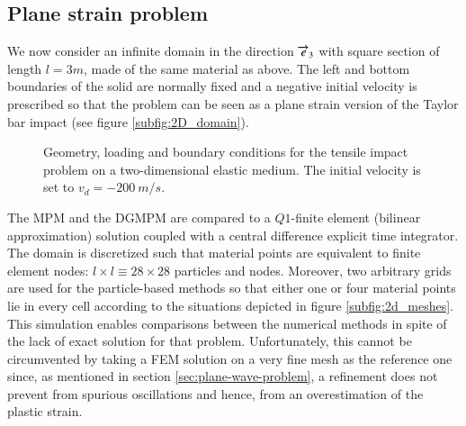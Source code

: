 
\subsection{Plane strain problem}
\label{sec:plane-strain-problem}
We now consider an infinite domain in the direction ${\overrightarrow{e}}_3$ with square section of length $l=3m$, made of the same material as above.
The left and bottom boundaries of the solid are normally fixed and a negative initial velocity is prescribed so that the problem can be seen as a plane strain version of the Taylor bar impact (see figure \ref{subfig:2D_domain}).
\begin{figure}[ht]
  \centering
   \qquad
  \caption{Geometry, loading and boundary conditions for the tensile impact problem on a two-dimensional elastic medium. The initial velocity is set to $v_d=-200 \: m/s$.}
  \label{fig:PS_domain}
\end{figure}


The MPM and the DGMPM are compared to a $Q1$-finite element (bilinear approximation) solution coupled with a central difference explicit time integrator.
The domain is discretized such that material points are equivalent to finite element nodes: $l\times l \equiv 28 \times 28$ particles and nodes.
Moreover, two arbitrary grids are used for the particle-based methods so that either one or four material points lie in every cell according to the situations depicted in figure \ref{subfig:2d_meshes}.
This simulation enables comparisons between the numerical methods in spite of the lack of exact solution for that problem.
Unfortunately, this cannot be circumvented by taking a FEM solution on a very fine mesh as the reference one since, as mentioned in section \ref{sec:plane-wave-problem}, a refinement does not prevent from spurious oscillations and hence, from an overestimation of the plastic strain.



